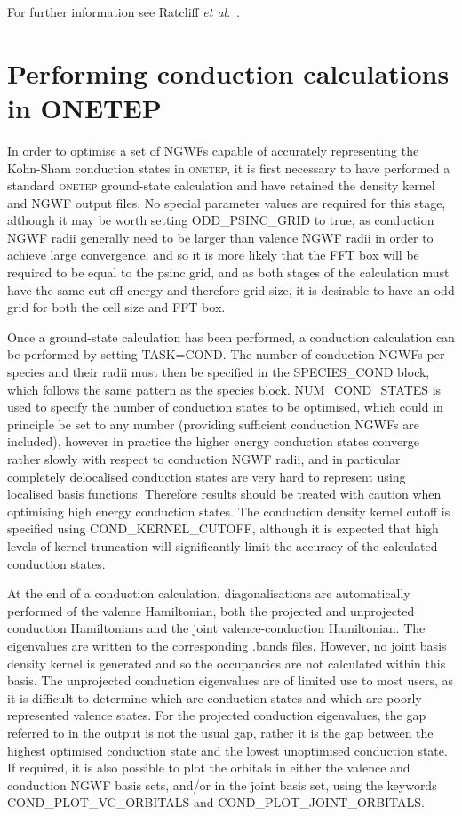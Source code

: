 \documentclass[a4paper,oneside,11pt]{article}
\begin{document}
For further information see Ratcliff \emph{et al}.~\cite{ratcliff}.

\section*{Performing conduction calculations in ONETEP}

In order to optimise a set of NGWFs capable of accurately representing the Kohn-Sham conduction states in \textsc{onetep}, it is first necessary to have performed a standard \textsc{onetep} ground-state calculation and have retained the density kernel and NGWF output files.  No special parameter values are required for this stage, although it may be worth setting ODD\_PSINC\_GRID to true, as conduction NGWF radii generally need to be larger than valence NGWF radii in order to achieve large convergence, and so it is more likely that the FFT box will be required to be equal to the psinc grid, and as both stages of the calculation must have the same cut-off energy and therefore grid size, it is desirable to have an odd grid for both the cell size and FFT box.

Once a ground-state calculation has been performed, a conduction calculation can be performed by setting TASK=COND.  The number of conduction NGWFs per species and their radii must then be specified in the SPECIES\_COND block, which follows the same pattern as the species block.  NUM\_COND\_STATES is used to specify the number of conduction states to be optimised, which could in principle be set to any number (providing sufficient conduction NGWFs are included), however in practice the higher energy conduction states converge rather slowly with respect to conduction NGWF radii, and in particular completely delocalised conduction states are very hard to represent using localised basis functions.  Therefore results should be treated with caution when optimising high energy conduction states.   The conduction density kernel cutoff is specified using COND\_KERNEL\_CUTOFF, although it is expected that high levels of kernel truncation will significantly limit the accuracy of the calculated conduction states.

At the end of a conduction calculation, diagonalisations are automatically performed of the valence Hamiltonian, both the projected and unprojected conduction Hamiltonians and the joint valence-conduction Hamiltonian.  The eigenvalues are written to the corresponding .bands files.  However, no joint basis density kernel is generated and so the occupancies are not calculated within this basis.  The unprojected conduction eigenvalues are of limited use to most users, as it is difficult to determine which are conduction states and which are poorly represented valence states.  For the projected conduction eigenvalues, the gap referred to in the output is not the usual gap, rather it is the gap between the highest optimised conduction state and the lowest unoptimised conduction state.  If required, it is also possible to plot the orbitals in either the valence and conduction NGWF basis sets, and/or in the joint basis set, using the keywords COND\_PLOT\_VC\_ORBITALS and COND\_PLOT\_JOINT\_ORBITALS.
\end{document}
